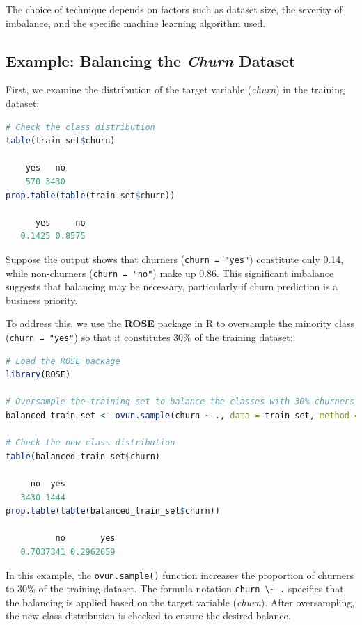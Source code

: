 \documentclass[
  11pt,
]{book}
\newcommand{\passthrough}[1]{#1}
\theoremstyle{definition}
\theoremstyle{definition}
\theoremstyle{definition}
\theoremstyle{definition}
\theoremstyle{remark}
\begin{document}
The choice of technique depends on factors such as dataset size, the severity of imbalance, and the specific machine learning algorithm used.

\subsection*{\texorpdfstring{Example: Balancing the \emph{Churn} Dataset}{Example: Balancing the Churn Dataset}}\label{example-balancing-the-churn-dataset}


First, we examine the distribution of the target variable (\emph{churn}) in the training dataset:

\begin{lstlisting}[language=R]
# Check the class distribution
table(train_set$churn)
   
    yes   no 
    570 3430
prop.table(table(train_set$churn))
   
      yes     no 
   0.1425 0.8575
\end{lstlisting}

Suppose the output shows that churners (\passthrough{\lstinline!churn = "yes"!}) constitute only 0.14, while non-churners (\passthrough{\lstinline!churn = "no"!}) make up 0.86. This significant imbalance suggests that balancing may be necessary, particularly if churn prediction is a business priority.

To address this, we use the \textbf{ROSE} package in R to oversample the minority class (\passthrough{\lstinline!churn = "yes"!}) so that it constitutes 30\% of the training dataset:

\begin{lstlisting}[language=R]
# Load the ROSE package
library(ROSE)

# Oversample the training set to balance the classes with 30% churners
balanced_train_set <- ovun.sample(churn ~ ., data = train_set, method = "over", p = 0.3)$data

# Check the new class distribution
table(balanced_train_set$churn)
   
     no  yes 
   3430 1444
prop.table(table(balanced_train_set$churn))
   
          no       yes 
   0.7037341 0.2962659
\end{lstlisting}

In this example, the \passthrough{\lstinline!ovun.sample()!} function increases the proportion of churners to 30\% of the training dataset. The formula notation \passthrough{\lstinline!churn \~ .!} specifies that the balancing is applied based on the target variable (\emph{churn}). After oversampling, the new class distribution is checked to ensure the desired balance.
\end{document}
